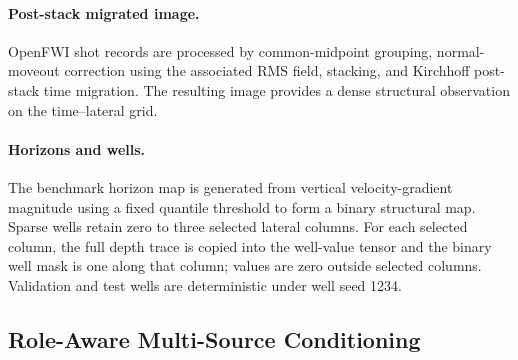 \paragraph{Post-stack migrated image.}
OpenFWI shot records are processed by common-midpoint grouping, normal-moveout correction using the associated RMS field, stacking, and Kirchhoff post-stack time migration. The resulting image provides a dense structural observation on the time--lateral grid.

\paragraph{Horizons and wells.}
The benchmark horizon map is generated from vertical velocity-gradient magnitude using a fixed quantile threshold to form a binary structural map. Sparse wells retain zero to three selected lateral columns. For each selected column, the full depth trace is copied into the well-value tensor and the binary well mask is one along that column; values are zero outside selected columns. Validation and test wells are deterministic under well seed 1234.

\subsection{Role-Aware Multi-Source Conditioning}

